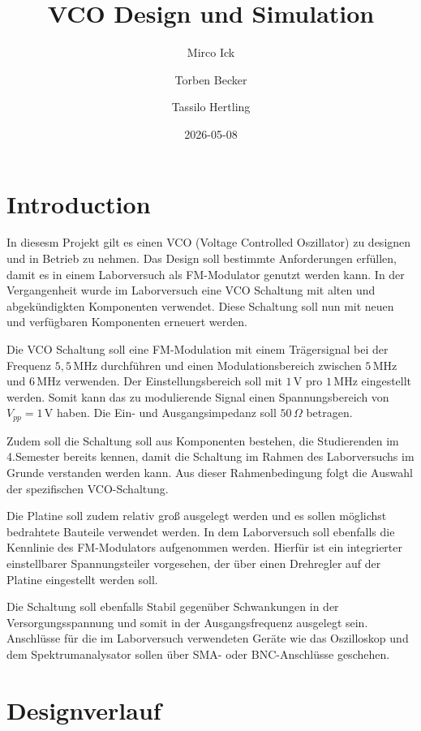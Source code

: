 \documentclass[
  letterpaper,
  DIV=11,
  numbers=noendperiod]{scrreprt}
\title{VCO Design und Simulation}
\author{Mirco Ick \and Torben Becker \and Tassilo Hertling}
\date{2026-05-08}
\renewcommand*\contentsname{Table of contents}
\newcommand\contentsname{Table of contents}
\begin{document}
\maketitle

\renewcommand*\contentsname{Table of contents}
{
\setcounter{tocdepth}{2}
\tableofcontents
}

\chapter{Introduction}\label{introduction}

In diesesm Projekt gilt es einen VCO (Voltage Controlled Oszillator) zu
designen und in Betrieb zu nehmen. Das Design soll bestimmte
Anforderungen erfüllen, damit es in einem Laborversuch als FM-Modulator
genutzt werden kann. In der Vergangenheit wurde im Laborversuch eine VCO
Schaltung mit alten und abgekündigkten Komponenten verwendet. Diese
Schaltung soll nun mit neuen und verfügbaren Komponenten erneuert
werden.

Die VCO Schaltung soll eine FM-Modulation mit einem Trägersignal bei der
Frequenz \(5,5\,\text{MHz}\) durchführen und einen Modulationsbereich
zwischen \(5\,\text{MHz}\) und \(6\,\text{MHz}\) verwenden. Der
Einstellungsbereich soll mit \(1\,\text{V}\) pro \(1\,\text{MHz}\)
eingestellt werden. Somit kann das zu modulierende Signal einen
Spannungsbereich von \(V_{pp} = 1\,\text{V}\) haben. Die Ein- und
Ausgangsimpedanz soll \(50\,\Omega\) betragen.

Zudem soll die Schaltung soll aus Komponenten bestehen, die Studierenden
im 4.Semester bereits kennen, damit die Schaltung im Rahmen des
Laborversuchs im Grunde verstanden werden kann. Aus dieser
Rahmenbedingung folgt die Auswahl der spezifischen VCO-Schaltung.

Die Platine soll zudem relativ groß ausgelegt werden und es sollen
möglichst bedrahtete Bauteile verwendet werden. In dem Laborversuch soll
ebenfalls die Kennlinie des FM-Modulators aufgenommen werden. Hierfür
ist ein integrierter einstellbarer Spannungsteiler vorgesehen, der über
einen Drehregler auf der Platine eingestellt werden soll.

Die Schaltung soll ebenfalls Stabil gegenüber Schwankungen in der
Versorgungsspannung und somit in der Ausgangsfrequenz ausgelegt sein.
Anschlüsse für die im Laborversuch verwendeten Geräte wie das
Oszilloskop und dem Spektrumanalysator sollen über SMA- oder
BNC-Anschlüsse geschehen.

\chapter{Designverlauf}\label{designverlauf}
\end{document}
